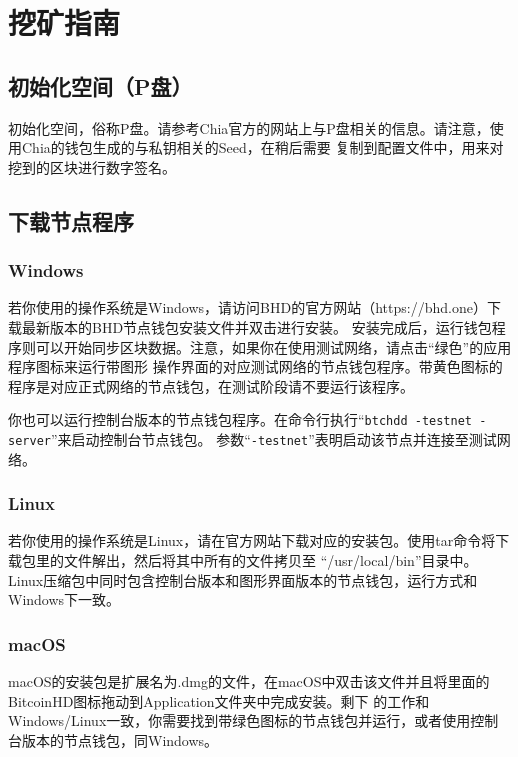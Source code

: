 \chapter{挖矿指南}
\section{初始化空间（P盘）}
\begin{flushleft}
    初始化空间，俗称P盘。请参考Chia官方的网站上与P盘相关的信息。请注意，使用Chia的钱包生成的与私钥相关的Seed，在稍后需要
    复制到配置文件中，用来对挖到的区块进行数字签名。
\end{flushleft}
\section{下载节点程序}
\subsection{Windows}
\begin{flushleft}
    若你使用的操作系统是Windows，请访问BHD的官方网站（https://bhd.one）下载最新版本的BHD节点钱包安装文件并双击进行安装。
    安装完成后，运行钱包程序则可以开始同步区块数据。注意，如果你在使用测试网络，请点击``绿色''的应用程序图标来运行带图形
    操作界面的对应测试网络的节点钱包程序。带黄色图标的程序是对应正式网络的节点钱包，在测试阶段请不要运行该程序。
\end{flushleft}
\begin{flushleft}
    你也可以运行控制台版本的节点钱包程序。在命令行执行``\texttt{btchdd -testnet -server}''来启动控制台节点钱包。
    参数``\texttt{-testnet}''表明启动该节点并连接至测试网络。
\end{flushleft}
\subsection{Linux}
\begin{flushleft}
    若你使用的操作系统是Linux，请在官方网站下载对应的安装包。使用tar命令将下载包里的文件解出，然后将其中所有的文件拷贝至
    ``/usr/local/bin''目录中。Linux压缩包中同时包含控制台版本和图形界面版本的节点钱包，运行方式和Windows下一致。
\end{flushleft}
\subsection{macOS}
\begin{flushleft}
    macOS的安装包是扩展名为.dmg的文件，在macOS中双击该文件并且将里面的BitcoinHD图标拖动到Application文件夹中完成安装。剩下
    的工作和Windows/Linux一致，你需要找到带绿色图标的节点钱包并运行，或者使用控制台版本的节点钱包，同Windows。
\end{flushleft}
